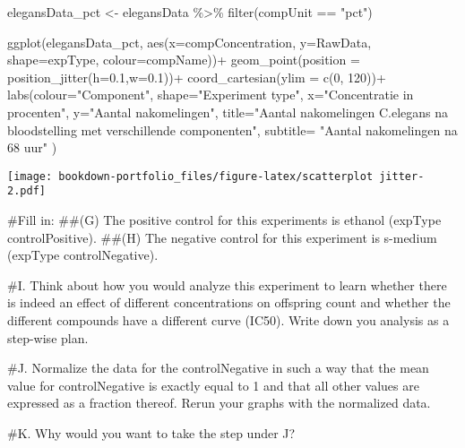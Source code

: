 \documentclass[
]{book}
\newenvironment{Shaded}{\begin{snugshade}}{\end{snugshade}}
\newcommand{\AttributeTok}[1]{\textcolor[rgb]{0.77,0.63,0.00}{#1}}
\newcommand{\DecValTok}[1]{\textcolor[rgb]{0.00,0.00,0.81}{#1}}
\newcommand{\FloatTok}[1]{\textcolor[rgb]{0.00,0.00,0.81}{#1}}
\newcommand{\FunctionTok}[1]{\textcolor[rgb]{0.00,0.00,0.00}{#1}}
\newcommand{\NormalTok}[1]{#1}
\newcommand{\OtherTok}[1]{\textcolor[rgb]{0.56,0.35,0.01}{#1}}
\newcommand{\SpecialCharTok}[1]{\textcolor[rgb]{0.00,0.00,0.00}{#1}}
\newcommand{\StringTok}[1]{\textcolor[rgb]{0.31,0.60,0.02}{#1}}
\begin{document}
\begin{Shaded}
\begin{Highlighting}[]
\NormalTok{elegansData\_pct }\OtherTok{\textless{}{-}}\NormalTok{ elegansData }\SpecialCharTok{\%\textgreater{}\%} \FunctionTok{filter}\NormalTok{(compUnit }\SpecialCharTok{==} \StringTok{"pct"}\NormalTok{)}

\FunctionTok{ggplot}\NormalTok{(elegansData\_pct, }\FunctionTok{aes}\NormalTok{(}\AttributeTok{x=}\NormalTok{compConcentration, }\AttributeTok{y=}\NormalTok{RawData, }\AttributeTok{shape=}\NormalTok{expType, }\AttributeTok{colour=}\NormalTok{compName))}\SpecialCharTok{+}
  \FunctionTok{geom\_point}\NormalTok{(}\AttributeTok{position =} \FunctionTok{position\_jitter}\NormalTok{(}\AttributeTok{h=}\FloatTok{0.1}\NormalTok{,}\AttributeTok{w=}\FloatTok{0.1}\NormalTok{))}\SpecialCharTok{+}
  \FunctionTok{coord\_cartesian}\NormalTok{(}\AttributeTok{ylim =} \FunctionTok{c}\NormalTok{(}\DecValTok{0}\NormalTok{, }\DecValTok{120}\NormalTok{))}\SpecialCharTok{+}
  \FunctionTok{labs}\NormalTok{(}\AttributeTok{colour=}\StringTok{"Component"}\NormalTok{, }\AttributeTok{shape=}\StringTok{"Experiment type"}\NormalTok{,}
       \AttributeTok{x=}\StringTok{"Concentratie in procenten"}\NormalTok{,}
       \AttributeTok{y=}\StringTok{"Aantal nakomelingen"}\NormalTok{,}
       \AttributeTok{title=}\StringTok{"Aantal nakomelingen C.elegans na bloodstelling met verschillende componenten"}\NormalTok{,}
       \AttributeTok{subtitle=} \StringTok{"Aantal nakomelingen na 68 uur"}
\NormalTok{)}
\end{Highlighting}
\end{Shaded}

\texttt{[image: bookdown-portfolio\_files/figure-latex/scatterplot jitter-2.pdf]}

\#Fill in:
\#\#(G) The positive control for this experiments is ethanol (expType controlPositive).
\#\#(H) The negative control for this experiment is s-medium (expType controlNegative).

\#I. Think about how you would analyze this experiment to learn whether there is indeed an effect of different concentrations on offspring count and whether the different compounds have a different curve (IC50). Write down you analysis as a step-wise plan.

\#J. Normalize the data for the controlNegative in such a way that the mean value for controlNegative is exactly equal to 1 and that all other values are expressed as a fraction thereof. Rerun your graphs with the normalized data.

\#K. Why would you want to take the step under J?
\end{document}
